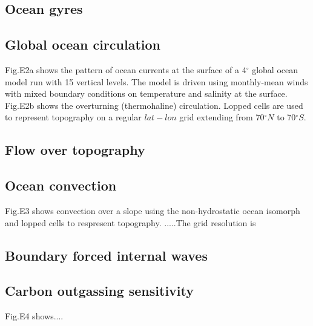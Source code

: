 \subsection{Ocean gyres}

\subsection{Global ocean circulation}

Fig.E2a shows the pattern of ocean currents at the surface of a 4$^{\circ }$
global ocean model run with 15 vertical levels. The model is driven using
monthly-mean winds with mixed boundary conditions on temperature and
salinity at the surface. Fig.E2b shows the overturning (thermohaline)
circulation. Lopped cells are used to represent topography on a regular $%
lat-lon$ grid extending from 70$^{\circ }N$ to 70$^{\circ }S$.

\subsection{Flow over topography}

\subsection{Ocean convection}

Fig.E3 shows convection over a slope using the non-hydrostatic ocean
isomorph and lopped cells to respresent topography. .....The grid resolution
is

\subsection{Boundary forced internal waves}

\subsection{Carbon outgassing sensitivity}

Fig.E4 shows....
